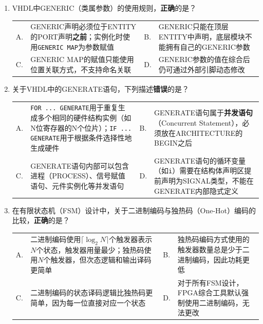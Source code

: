 \begin{enumerate}[label=\arabic*.]
\vspace{0.6cm}

\item VHDL中GENERIC（类属参数）的使用规则，\textbf{正确}的是？

\vspace{0.2cm}

\begin{tabular}{@{}lp{}@{\qquad}lp{}@{}}
A. & GENERIC声明必须位于ENTITY的PORT声明\textbf{之前}；实例化时使用\texttt{GENERIC MAP}为参数赋值 &
B. & GENERIC只能在顶层ENTITY中声明，底层模块不能拥有自己的GENERIC参数 \\
C. & GENERIC MAP的赋值只能使用位置关联方式，不支持命名关联 &
D. & GENERIC参数的值在综合后仍可通过外部引脚动态修改 \\
\end{tabular}

\vspace{0.6cm}

\item 关于VHDL中的GENERATE语句，下列描述\textbf{错误}的是？

\vspace{0.2cm}

\begin{tabular}{@{}lp{}@{\qquad}lp{}@{}}
A. & \texttt{FOR ... GENERATE}用于重复生成多个相同的硬件结构实例（如N位寄存器的N个位片）；\texttt{IF ... GENERATE}用于根据条件选择性地生成硬件 &
B. & GENERATE语句属于\textbf{并发语句}（Concurrent Statement），必须放在ARCHITECTURE的BEGIN之后 \\
C. & GENERATE语句内部可以包含进程（PROCESS）、信号赋值语句、元件实例化等并发语句 &
D. & GENERATE语句的循环变量（如\texttt{i}）需要在结构体声明区提前声明为SIGNAL类型，不能在GENERATE内部隐式定义 \\
\end{tabular}

\vspace{0.6cm}

\item 在有限状态机（FSM）设计中，关于二进制编码与独热码（One-Hot）编码的比较，\textbf{正确}的是？

\vspace{0.2cm}

\begin{tabular}{@{}lp{}@{\qquad}lp{}@{}}
A. & 二进制编码使用$\lceil\log_2 N\rceil$个触发器表示$N$个状态，触发器用量最少；独热码使用$N$个触发器，但次态逻辑和输出译码更简单 &
B. & 独热码编码方式使用的触发器数量总是少于二进制编码，因此功耗更低 \\
C. & 二进制编码的状态译码逻辑比独热码更简单，因为每一位直接对应一个状态 &
D. & 对于所有FSM设计，FPGA综合工具默认强制使用二进制编码，无法更改 \\
\end{tabular}

\end{enumerate}

